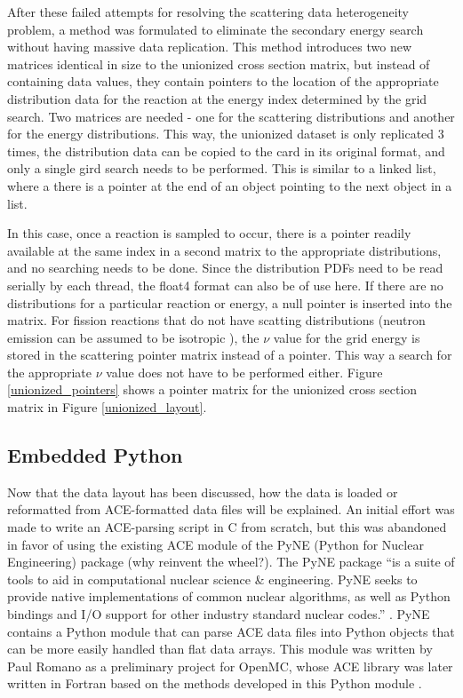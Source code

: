 After these failed attempts for resolving the scattering data heterogeneity problem, a method was formulated to eliminate the secondary energy search without having massive data replication.  This method introduces two new matrices identical in size to the unionized cross section matrix, but instead of containing data values, they contain pointers to the location of the appropriate distribution data for the reaction at the energy index determined by the grid search.  Two matrices are needed - one for the scattering distributions and another for the energy distributions.  This way, the unionized dataset is only replicated 3 times, the distribution data can be copied to the card in its original format, and only a single gird search needs to be performed.  This is similar to a linked list, where a there is a pointer at the end of an object pointing to the next object in a list.  

In this case, once a reaction is sampled to occur, there is a pointer readily available at the same index in a second matrix to the appropriate distributions, and no searching needs to be done.  Since the distribution PDFs need to be read serially by each thread, the float4 format can also be of use here.  If there are no distributions for a particular reaction or energy, a null pointer is inserted into the matrix.  For fission reactions that do not have scatting distributions (neutron emission can be assumed to be isotropic \cite{openmc}), the $\nu$ value for the grid energy is stored in the scattering pointer matrix instead of a pointer.  This way a search for the appropriate $\nu$ value does not have to be performed either.  Figure \ref{unionized_pointers} shows a pointer matrix for the unionized cross section matrix in Figure \ref{unionized_layout}.

\subsection{Embedded Python}

Now that the data layout has been discussed, how the data is loaded or reformatted from ACE-formatted data files will be explained.  An initial effort was made to write an ACE-parsing script in C from scratch, but this was abandoned in favor of using the existing ACE module of the PyNE (Python for Nuclear Engineering) package \cite{pyne} (why reinvent the wheel?).  The PyNE package ``is a suite of tools to aid in computational nuclear science \& engineering. PyNE seeks to provide native implementations of common nuclear algorithms, as well as Python bindings and I/O support for other industry standard nuclear codes.'' \cite{pyne}.  PyNE contains a Python module that can parse ACE data files into Python objects that can be more easily handled than flat data arrays.  This module was written by Paul Romano as a preliminary project for OpenMC, whose ACE library was later written in Fortran based on the methods developed in this Python module \cite{pyne,openmc}.  

